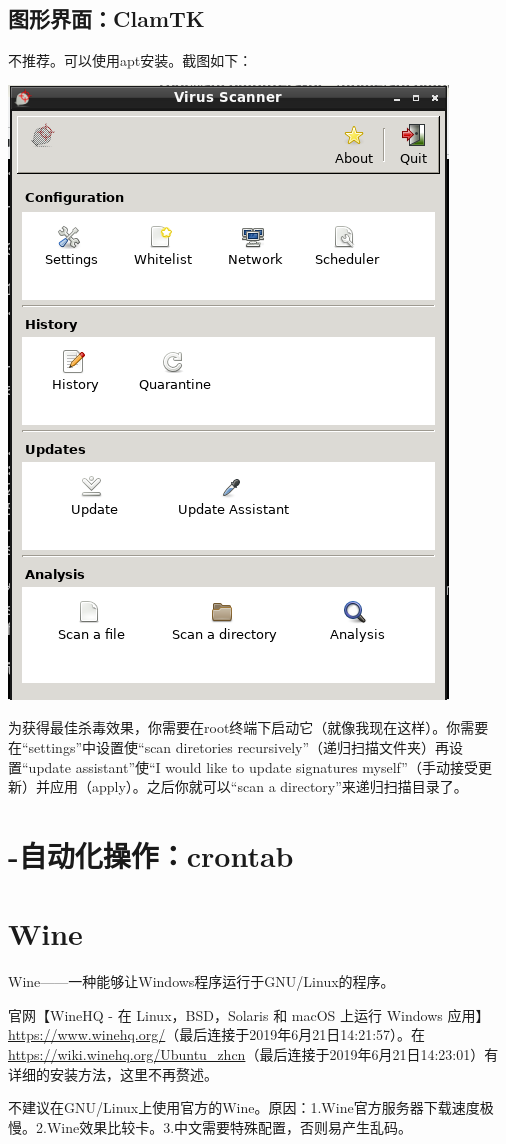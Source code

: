 \subsection{图形界面：ClamTK}
不推荐。可以使用apt安装。截图如下：
\begin{center}
	\includegraphics[scale=0.5]{pic/ctk}
\end{center} \par
为获得最佳杀毒效果，你需要在root终端下启动它（就像我现在这样）。你需要在“settings”中设置使“scan diretories recursively”（递归扫描文件夹）再设置“update assistant”使“I would like to update signatures myself”（手动接受更新）并应用（apply）。之后你就可以“scan a directory”来递归扫描目录了。
\section{-自动化操作：crontab}
\section{Wine}
Wine——一种能够让Windows程序运行于GNU/Linux的程序。\par
官网【WineHQ - 在 Linux，BSD，Solaris 和 macOS 上运行 Windows 应用】\url{https://www.winehq.org/}（最后连接于2019年6月21日14:21:57）。在\url{https://wiki.winehq.org/Ubuntu_zhcn}（最后连接于2019年6月21日14:23:01）有详细的安装方法，这里不再赘述。\par
不建议在GNU/Linux上使用官方的Wine。原因：1.Wine官方服务器下载速度极慢。2.Wine效果比较卡。3.中文需要特殊配置，否则易产生乱码。
